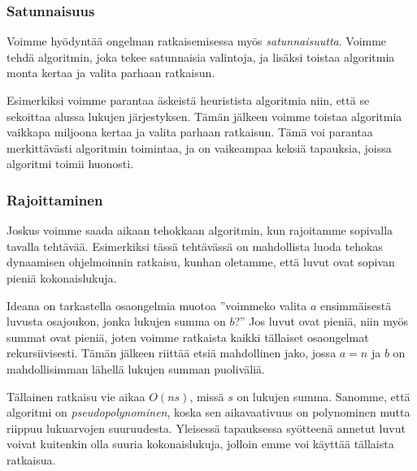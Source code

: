\subsubsection{Satunnaisuus}


Voimme hyödyntää ongelman ratkaisemisessa myös
\emph{satunnaisuutta}.
Voimme tehdä algoritmin, joka tekee satunnaisia valintoja,
ja lisäksi toistaa algoritmia monta kertaa ja valita
parhaan ratkaisun.

Esimerkiksi voimme parantaa äskeistä heuristista algoritmia niin,
että se sekoittaa alussa lukujen järjestyksen. Tämän jälkeen voimme toistaa
algoritmia vaikkapa miljoona kertaa ja valita parhaan ratkaisun.
Tämä voi parantaa merkittävästi algoritmin toimintaa, ja on
vaikeampaa keksiä tapauksia, joissa algoritmi toimii huonosti.

\subsubsection{Rajoittaminen}


Joskus voimme saada aikaan tehokkaan algoritmin,
kun rajoitamme sopivalla tavalla tehtävää.
Esimerkiksi tässä tehtävässä on mahdollista luoda
tehokas dynaamisen ohjelmoinnin ratkaisu,
kunhan oletamme, että luvut ovat sopivan pieniä kokonaislukuja.

Ideana on tarkastella osaongelmia muotoa
''voimmeko valita $a$ ensimmäisestä luvusta osajoukon,
jonka lukujen summa on $b$?''
Jos luvut ovat pieniä, niin myös summat ovat pieniä,
joten voimme ratkaista kaikki tällaiset osaongelmat rekursiivisesti.
Tämän jälkeen riittää etsiä mahdollinen jako, jossa $a=n$
ja $b$ on mahdollisimman lähellä lukujen summan puoliväliä.

Tällainen ratkaisu vie aikaa $O(ns)$, missä $s$ on lukujen summa.
Sanomme, että algoritmi on \emph{pseudopolynominen},
koska sen aikavaativuus on polynominen mutta riippuu lukuarvojen suuruudesta.
Yleisessä tapauksessa syötteenä annetut luvut voivat
kuitenkin olla suuria kokonaislukuja,
jolloin emme voi käyttää tällaista ratkaisua.
